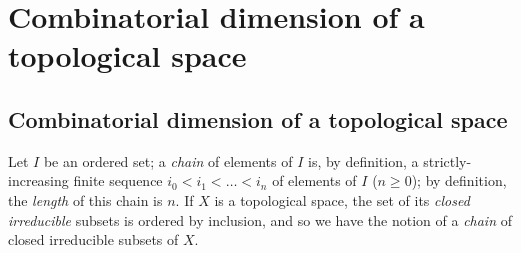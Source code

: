 \section{Combinatorial dimension of a topological space}
\label{section:combinatorial-dimension-of-a-topological-space}

\subsection{Combinatorial dimension of a topological space}
\label{subsection:combinatorial-dimension-of-a-topological-space}

\begin{env}[14.1.1]
Let $I$ be an ordered set;
a \emph{chain} of elements of $I$ is, by definition, a strictly-increasing finite sequence $i_0<i_1<\ldots<i_n$ of elements of $I$ ($n\geq0$);
by definition, the \emph{length} of this chain is $n$.
If $X$ is a topological space, the set of its \emph{closed irreducible} subsets is ordered by inclusion, and so we have the notion of a \emph{chain} of closed irreducible subsets of $X$.
\end{env}

\begin{defn}[14.1.2]
\end{defn}
